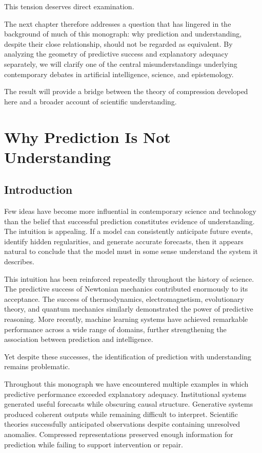 \documentclass[11pt,oneside,openany]{book}
\begin{document}
This tension deserves direct examination.

The next chapter therefore addresses a question that has lingered in the background of much of this monograph: why prediction and understanding, despite their close relationship, should not be regarded as equivalent. By analyzing the geometry of predictive success and explanatory adequacy separately, we will clarify one of the central misunderstandings underlying contemporary debates in artificial intelligence, science, and epistemology.

The result will provide a bridge between the theory of compression developed here and a broader account of scientific understanding.

\chapter{Why Prediction Is Not Understanding}

\section{Introduction}

Few ideas have become more influential in contemporary science and technology than the belief that successful prediction constitutes evidence of understanding. The intuition is appealing. If a model can consistently anticipate future events, identify hidden regularities, and generate accurate forecasts, then it appears natural to conclude that the model must in some sense understand the system it describes.

This intuition has been reinforced repeatedly throughout the history of science. The predictive success of Newtonian mechanics contributed enormously to its acceptance. The success of thermodynamics, electromagnetism, evolutionary theory, and quantum mechanics similarly demonstrated the power of predictive reasoning. More recently, machine learning systems have achieved remarkable performance across a wide range of domains, further strengthening the association between prediction and intelligence.

Yet despite these successes, the identification of prediction with understanding remains problematic.

Throughout this monograph we have encountered multiple examples in which predictive performance exceeded explanatory adequacy. Institutional systems generated useful forecasts while obscuring causal structure. Generative systems produced coherent outputs while remaining difficult to interpret. Scientific theories successfully anticipated observations despite containing unresolved anomalies. Compressed representations preserved enough information for prediction while failing to support intervention or repair.
\end{document}
